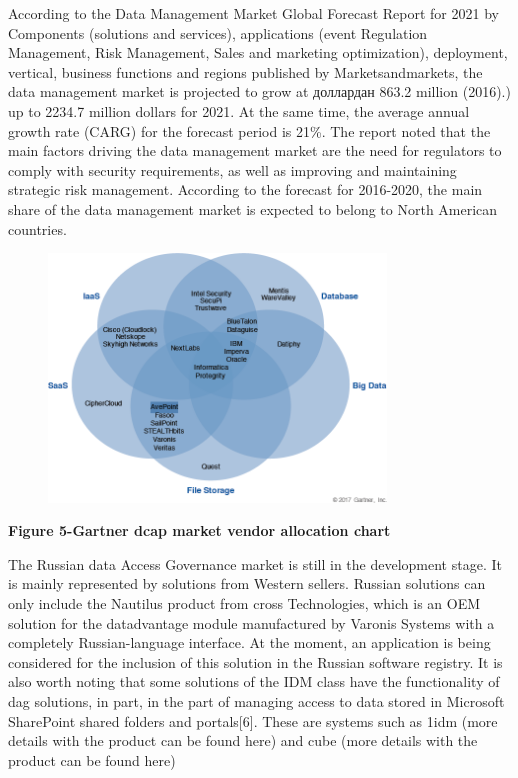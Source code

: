 According to the Data Management Market Global Forecast Report for 2021
by Components (solutions and services), applications (event Regulation
Management, Risk Management, Sales and marketing optimization),
deployment, vertical, business functions and regions published by
Marketsandmarkets, the data management market is projected to grow at
доллардан 863.2 million (2016).) up to 2234.7 million dollars for 2021.
At the same time, the average annual growth rate (CARG) for the forecast
period is 21\%. The report noted that the main factors driving the data
management market are the need for regulators to comply with security
requirements, as well as improving and maintaining strategic risk
management. According to the forecast for 2016-2020, the main share of
the data management market is expected to belong to North American
countries.

\begin{figure}[H]
	\centering
	\includegraphics[width=0.8\textwidth]{assets/67}
	\caption*{}
\end{figure}

\textbf{Figure 5-Gartner dcap market vendor allocation chart}

The Russian data Access Governance market is still in the development
stage. It is mainly represented by solutions from Western sellers.
Russian solutions can only include the Nautilus product from cross
Technologies, which is an OEM solution for the datadvantage module
manufactured by Varonis Systems with a completely Russian-language
interface. At the moment, an application is being considered for the
inclusion of this solution in the Russian software registry. It is also
worth noting that some solutions of the IDM class have the functionality
of dag solutions, in part, in the part of managing access to data stored
in Microsoft SharePoint shared folders and portals{[}6{]}. These are
systems such as 1idm (more details with the product can be found here)
and cube (more details with the product can be found here)

